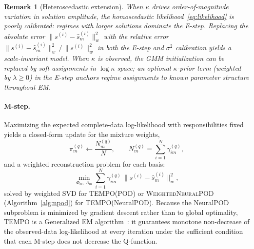 \documentclass{article}
\newtheorem{remark}{Remark}
\begin{document}
\begin{remark}[Heteroscedastic extension]
When $\kappa$ drives order-of-magnitude variation in solution amplitude,
the homoscedastic likelihood~\eqref{eq:likelihood} is poorly calibrated:
regimes with larger solutions dominate the E-step.
Replacing the absolute error $\|s^{(i)}-\hat{s}_m^{(i)}\|_w^2$ with the
relative error $\|s^{(i)}-\hat{s}_m^{(i)}\|_w^2\,/\,\|s^{(i)}\|_w^2$
in both the E-step and $\sigma^2$ calibration yields a scale-invariant model.
When $\kappa$ is observed, the GMM initialization can be replaced by soft
assignments in $\log\kappa$ space; an optional $\kappa$-prior term
(weighted by $\lambda \ge 0$) in the E-step anchors regime assignments
to known parameter structure throughout EM.
\end{remark}

\paragraph{M-step.}
Maximizing the expected complete-data log-likelihood with
responsibilities fixed yields a closed-form update for the mixture
weights,
\begin{equation}
  \pi_m^{(q)} \leftarrow \frac{N_m^{(q)}}{N},
  \qquad N_m^{(q)} = \sum_{i=1}^{N}\gamma_{im}^{(q)},
  \label{eq:mstep_pi}
\end{equation}
and a weighted reconstruction problem for each basis:
\begin{equation}
  \min_{\Phi_m,\,\Lambda_m}
  \sum_{i=1}^{N} \gamma_{im}^{(q)}\,\|s^{(i)} - \hat{s}_m^{(i)}\|_w^2,
  \label{eq:mstep_phi}
\end{equation}
solved by weighted SVD for TEMPO(POD) or
\textsc{WeightedNeuralPOD} (Algorithm~\ref{alg:npod}) for
TEMPO(NeuralPOD).
Because the NeuralPOD subproblem is minimized by gradient descent
rather than to global optimality, TEMPO is a Generalized EM
algorithm~\cite{Neal1998}: it guarantees monotone non-decrease of the
observed-data log-likelihood at every iteration under the
sufficient condition that each M-step does not decrease the
Q-function.
\end{document}
